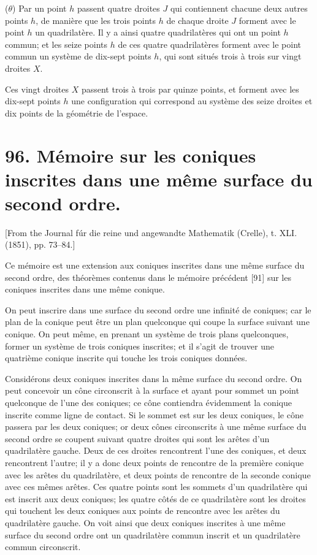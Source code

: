 \documentclass[12pt,a4paper]{article}
\theoremstyle{definition}
\begin{document}
($\theta$) Par un point $h$ passent quatre droites $J$ qui contiennent chacune deux autres points $h$, de mani\`{e}re que les trois points $h$ de chaque droite $J$ forment avec le point $h$ un quadrilat\`{e}re. Il y a ainsi quatre quadrilat\`{e}res qui ont un point $h$ commun; et les seize points $h$ de ces quatre quadrilat\`{e}res forment avec le point commun un syst\`{e}me de dix-sept points $h$, qui sont situ\'{e}s trois \`{a} trois sur vingt droites $X$.

Ces vingt droites $X$ passent trois \`{a} trois par quinze points, et forment avec les dix-sept points $h$ une configuration qui correspond au syst\`{e}me des seize droites et dix points de la g\'{e}om\'{e}trie de l'espace.

\newpage

\section*{96. M\'{e}moire sur les coniques inscrites dans une m\^{e}me surface du second ordre.}

[From the Journal f\'{u}r die reine und angewandte Mathematik (Crelle), t. XLI. (1851), pp. 73--84.]

Ce m\'{e}moire est une extension aux coniques inscrites dans une m\^{e}me surface du second ordre, des th\'{e}or\`{e}mes contenus dans le m\'{e}moire pr\'{e}c\'{e}dent [91] sur les coniques inscrites dans une m\^{e}me conique.

On peut inscrire dans une surface du second ordre une infinit\'{e} de coniques; car le plan de la conique peut \^{e}tre un plan quelconque qui coupe la surface suivant une conique. On peut m\^{e}me, en prenant un syst\`{e}me de trois plans quelconques, former un syst\`{e}me de trois coniques inscrites; et il s'agit de trouver une quatri\`{e}me conique inscrite qui touche les trois coniques donn\'{e}es.

Consid\'{e}rons deux coniques inscrites dans la m\^{e}me surface du second ordre. On peut concevoir un c\^{o}ne circonscrit \`{a} la surface et ayant pour sommet un point quelconque de l'une des coniques; ce c\^{o}ne contiendra \'{e}videmment la conique inscrite comme ligne de contact. Si le sommet est sur les deux coniques, le c\^{o}ne passera par les deux coniques; or deux c\^{o}nes circonscrits \`{a} une m\^{e}me surface du second ordre se coupent suivant quatre droites qui sont les ar\^{e}tes d'un quadrilat\`{e}re gauche. Deux de ces droites rencontrent l'une des coniques, et deux rencontrent l'autre; il y a donc deux points de rencontre de la premi\`{e}re conique avec les ar\^{e}tes du quadrilat\`{e}re, et deux points de rencontre de la seconde conique avec ces m\^{e}mes ar\^{e}tes. Ces quatre points sont les sommets d'un quadrilat\`{e}re qui est inscrit aux deux coniques; les quatre c\^{o}t\'{e}s de ce quadrilat\`{e}re sont les droites qui touchent les deux coniques aux points de rencontre avec les ar\^{e}tes du quadrilat\`{e}re gauche. On voit ainsi que deux coniques inscrites \`{a} une m\^{e}me surface du second ordre ont un quadrilat\`{e}re commun inscrit et un quadrilat\`{e}re commun circonscrit.
\end{document}
